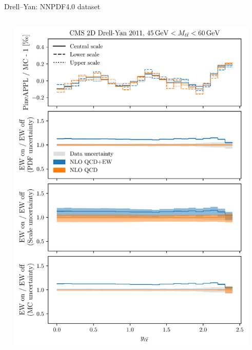 \begin{frame}{Drell--Yan: NNPDF4.0 dataset}
\begin{columns}[T,onlytextwidth]
\begin{column}{.5\textwidth}
\end{column}
\begin{column}{.5\textwidth}
\includegraphics[width=0.94\textwidth]{ew_corrections/figures/pineappl_CMSDY2D11_bin3}
\end{column}
\end{columns}
\end{frame}

